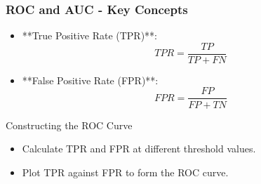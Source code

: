 \documentclass[aspectratio=169]{beamer}
\begin{document}
\begin{frame}[fragile]
    \frametitle{ROC and AUC - Key Concepts}
    \begin{itemize}
        \item **True Positive Rate (TPR)**:
            \begin{equation}
            TPR = \frac{TP}{TP + FN}
            \end{equation}
        \item **False Positive Rate (FPR)**:
            \begin{equation}
            FPR = \frac{FP}{FP + TN}
            \end{equation}
    \end{itemize}
    \begin{block}{Constructing the ROC Curve}
        \begin{itemize}
            \item Calculate TPR and FPR at different threshold values.
            \item Plot TPR against FPR to form the ROC curve.
        \end{itemize}
    \end{block}
\end{frame}
\end{document}
